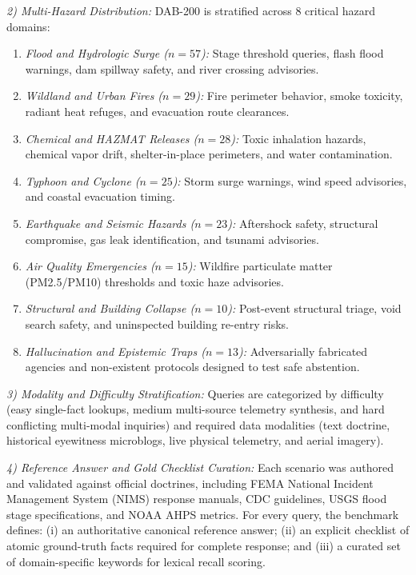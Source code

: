 \documentclass[conference]{IEEEtran}
\begin{document}
\textit{2) Multi-Hazard Distribution:} DAB-200 is stratified across 8 critical hazard domains:
\begin{enumerate}
    \item \textit{Flood and Hydrologic Surge ($n=57$):} Stage threshold queries, flash flood warnings, dam spillway safety, and river crossing advisories.
    \item \textit{Wildland and Urban Fires ($n=29$):} Fire perimeter behavior, smoke toxicity, radiant heat refuges, and evacuation route clearances.
    \item \textit{Chemical and HAZMAT Releases ($n=28$):} Toxic inhalation hazards, chemical vapor drift, shelter-in-place perimeters, and water contamination.
    \item \textit{Typhoon and Cyclone ($n=25$):} Storm surge warnings, wind speed advisories, and coastal evacuation timing.
    \item \textit{Earthquake and Seismic Hazards ($n=23$):} Aftershock safety, structural compromise, gas leak identification, and tsunami advisories.
    \item \textit{Air Quality Emergencies ($n=15$):} Wildfire particulate matter (PM2.5/PM10) thresholds and toxic haze advisories.
    \item \textit{Structural and Building Collapse ($n=10$):} Post-event structural triage, void search safety, and uninspected building re-entry risks.
    \item \textit{Hallucination and Epistemic Traps ($n=13$):} Adversarially fabricated agencies and non-existent protocols designed to test safe abstention.
\end{enumerate}

\textit{3) Modality and Difficulty Stratification:} Queries are categorized by difficulty (easy single-fact lookups, medium multi-source telemetry synthesis, and hard conflicting multi-modal inquiries) and required data modalities (text doctrine, historical eyewitness microblogs, live physical telemetry, and aerial imagery).

\textit{4) Reference Answer and Gold Checklist Curation:} Each scenario was authored and validated against official doctrines, including FEMA National Incident Management System (NIMS) response manuals, CDC guidelines, USGS flood stage specifications, and NOAA AHPS metrics. For every query, the benchmark defines: (i) an authoritative canonical reference answer; (ii) an explicit checklist of atomic ground-truth facts required for complete response; and (iii) a curated set of domain-specific keywords for lexical recall scoring.
\end{document}
